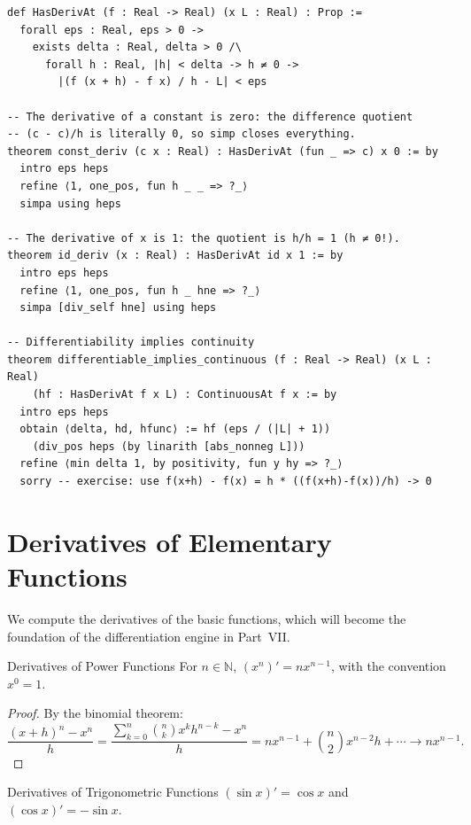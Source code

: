\documentclass[12pt, openany]{book}
\theoremstyle{plain}
\theoremstyle{definition}
\theoremstyle{remark}
\newcommand{\N}{\mathbb{N}}
\begin{document}
\begin{leanbox}
\begin{lstlisting}
def HasDerivAt (f : Real -> Real) (x L : Real) : Prop :=
  forall eps : Real, eps > 0 ->
    exists delta : Real, delta > 0 /\
      forall h : Real, |h| < delta -> h ≠ 0 ->
        |(f (x + h) - f x) / h - L| < eps

-- The derivative of a constant is zero: the difference quotient
-- (c - c)/h is literally 0, so simp closes everything.
theorem const_deriv (c x : Real) : HasDerivAt (fun _ => c) x 0 := by
  intro eps heps
  refine ⟨1, one_pos, fun h _ _ => ?_⟩
  simpa using heps

-- The derivative of x is 1: the quotient is h/h = 1 (h ≠ 0!).
theorem id_deriv (x : Real) : HasDerivAt id x 1 := by
  intro eps heps
  refine ⟨1, one_pos, fun h _ hne => ?_⟩
  simpa [div_self hne] using heps

-- Differentiability implies continuity
theorem differentiable_implies_continuous (f : Real -> Real) (x L : Real)
    (hf : HasDerivAt f x L) : ContinuousAt f x := by
  intro eps heps
  obtain ⟨delta, hd, hfunc⟩ := hf (eps / (|L| + 1))
    (div_pos heps (by linarith [abs_nonneg L]))
  refine ⟨min delta 1, by positivity, fun y hy => ?_⟩
  sorry -- exercise: use f(x+h) - f(x) = h * ((f(x+h)-f(x))/h) -> 0
\end{lstlisting}
\end{leanbox}
\color{black}

\section{Derivatives of Elementary Functions}

We compute the derivatives of the basic functions, which will become the foundation of the differentiation engine in Part~VII.

\begin{thmbox}{Derivatives of Power Functions}
For $n \in \N$, $(x^n)' = nx^{n-1}$, with the convention $x^0 = 1$.
\end{thmbox}
\color{black}

\begin{proof}
By the binomial theorem:
\[ \frac{(x+h)^n - x^n}{h} = \frac{\sum_{k=0}^n \binom{n}{k} x^k h^{n-k} - x^n}{h} = nx^{n-1} + \binom{n}{2}x^{n-2}h + \cdots \to nx^{n-1}. \]
\end{proof}

\begin{thmbox}{Derivatives of Trigonometric Functions}
$(\sin x)' = \cos x$ and $(\cos x)' = -\sin x$.
\end{thmbox}
\color{black}
\end{document}
